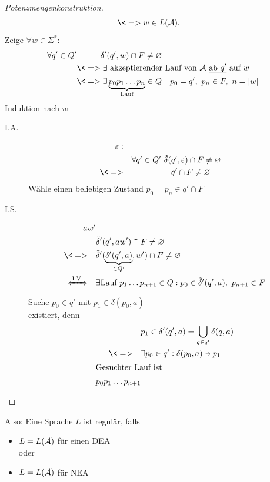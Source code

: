 {\begin{proof}[Potenzmengenkonstruktion]
\begin{align*}
                &\<=> w\in L(\A).
        \end{align*}
        Zeige $\forall w\in\Sigma^*$:
        \begin{align*}
                \forall q'\in Q' &\phantom{\<=>} \tilde\delta'(q',w)\cap F\neq \varnothing\\
                &\<=> \exists\text{ akzeptierender Lauf von $\A$ \underline{ab $q'$} auf }w\\
                &\<=> \exists \underbrace{p_0p_1\dots p_n}_{\text{Lauf}}\in Q \quad p_0=q',\ p_n\in F,\ n=|w|
        \end{align*}
        Induktion nach $w$
        \begin{description}
        \item[I.A.]
                \begin{alignat*}{2}
                        \Eps:\\
                        &&\forall q'\in Q'\ \tilde\delta(&q',\Eps)\cap F\neq \varnothing\\
                        \<=>&& &q'\cap F\neq \varnothing
                \end{alignat*}
                Wähle einen beliebigen Zustand $p_0=p_n\in q'\cap F$
        \item[I.S.]
        \begin{align*}
                aw'&\\
                &\tilde\delta'(q',aw')\cap F\neq \varnothing\\
                \<=>\quad& \tilde\delta'(\underbrace{\delta'(q',a)}_{\in Q'},w')\cap F\neq\varnothing\\
                \xLeftrightarrow{\text{I.V.}}\quad& \exists \text{Lauf\ } p_1\dots p_{n+1}\in Q : p_0\in\tilde\delta'(q', a),\ p_{n+1}\in F
        \end{align*}
        Suche $p_0\in q'$ mit $p_1\in\delta(p_0,a)$\\
        existiert, denn
        \begin{align*}
                & p_1\in \delta'(q', a) =  \bigcup_{q\in q'} \delta(q,a)\\
                \<=>\quad & \exists p_0\in q' : \delta(p_0,a) \ni p_1\\
                \shortintertext{Gesuchter Lauf ist}
                p_0p_1\dots p_{n+1}
        \end{align*}
        \end{description}
\end{proof}
Also: Eine Sprache $L$ ist regulär, falls
\begin{itemize}
\item $L = L(\mathcal{A})$ für einen \ac{DEA}\\
	oder
\item $L = L(\mathcal{A})$ für \ac{NEA}
\end{itemize}

}

